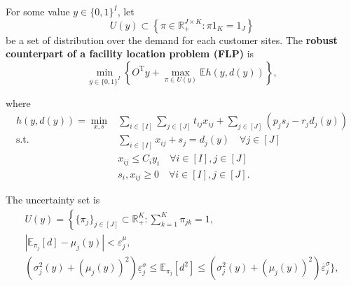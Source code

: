 \documentclass{beamer}
\newcommand{\R}{\mathbb{R}}
\newcommand{\T}{\mathrm{T}}
\newcommand{\E}{\mathbb{E}}
\begin{document}
\begin{frame}[allowframebreaks]
	\framebreak
	\begin{definition}
		For some value $y \in \{0, 1\}^{I}$, let
		\begin{equation*}
			U(y) \subset \left\{\pi \in \R_+^{J \times K}: \pi 1_K = 1_J\right\}
		\end{equation*}
		be a set of distribution over the demand for each customer sites. The \textbf{robust counterpart of a facility location problem (FLP)} is
		\begin{equation} \label{eq:outterproblem}
			\min_{y \in \{0, 1\}^I} \left\{O^\T y + \max_{\pi \in U(y)} \E h(y, d(y))\right\},
		\end{equation}
	\end{definition}
	\framebreak
	\begin{definition}
		where
		\begin{subequations}
			\label{eq:innerproblem}
			\begin{align}
				h(y, d(y)) = \min_{x, s} &\sum_{i \in [I]} \sum_{j \in [J]} t_{ij}x_{ij} + \sum_{j \in [J]} (p_j s_j - r_j d_j(y)) \\
				\text{s.t.} &\sum_{i \in [I]} x_{ij} + s_j = d_j(y) \quad \forall j \in [J] \\
				&x_{ij} \le C_i y_i \quad \forall i \in [I], j \in [J] \\
				&s_i, x_{ij} \ge 0 \quad \forall i \in [I], j \in [J].
			\end{align}
		\end{subequations}
	\end{definition}
	
	\framebreak
	\begin{definition}
		The uncertainty set is
		\begin{equation*}
			\begin{split}
				U(y) = \left\{\{\pi_j\}_{j \in [J]} \subset \R_+^{K} : \sum_{k=1}^{K} \pi_{jk} = 1, \right.\\
				\left|\E_{\pi_j}[d] - \mu_j(y)\right| < \varepsilon_j^\mu, \\
				\left(\sigma_j^2(y) + (\mu_j(y))^2\right)\underline{\varepsilon}_j^\sigma \le
				\E_{\pi_j}[d^2] \le \left(\sigma_j^2(y) + (\mu_j(y))^2\right)\overline{\varepsilon}_j^\sigma \Bigg\},
			\end{split}
		\end{equation*}
	\end{definition}
	

\end{frame}
\end{document}
